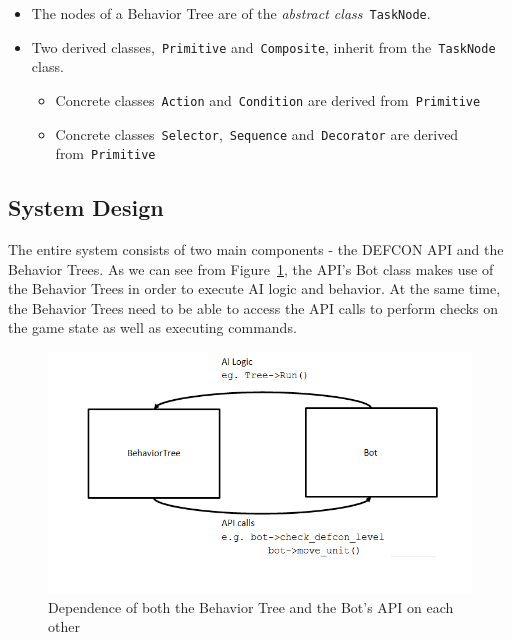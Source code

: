     \begin{itemize}
    \item The nodes of a Behavior Tree are of the \emph{abstract class}~\texttt{TaskNode}. 
    \item Two derived classes,~\texttt{Primitive} and~\texttt{Composite}, inherit from the~\texttt{TaskNode} class.
        \begin{itemize}
        \item Concrete classes~\texttt{Action} and~\texttt{Condition} are derived from~\texttt{Primitive}
        \item Concrete classes~\texttt{Selector},~\texttt{Sequence} and~\texttt{Decorator} are derived from~\texttt{Primitive}
        \end{itemize}   
    \end{itemize}    
    
    
    \subsection{System Design}
    
    The entire system consists of two main components - the DEFCON API and the Behavior Trees. As we can see from Figure~\ref{img:dependency}, the API's Bot class makes use of the Behavior Trees in order to execute AI logic and behavior. At the same time, the Behavior Trees need to be able to access the API calls to perform checks on the game state as well as executing commands. 
    
    \begin{figure}[h]                
        \begin{center}
        \includegraphics[scale=0.3]{images/dependency.png}
        \caption{Dependence of both the Behavior Tree and the Bot's API on each other}
        \label{img:dependency}
        \end{center}            
    \end{figure}
    
